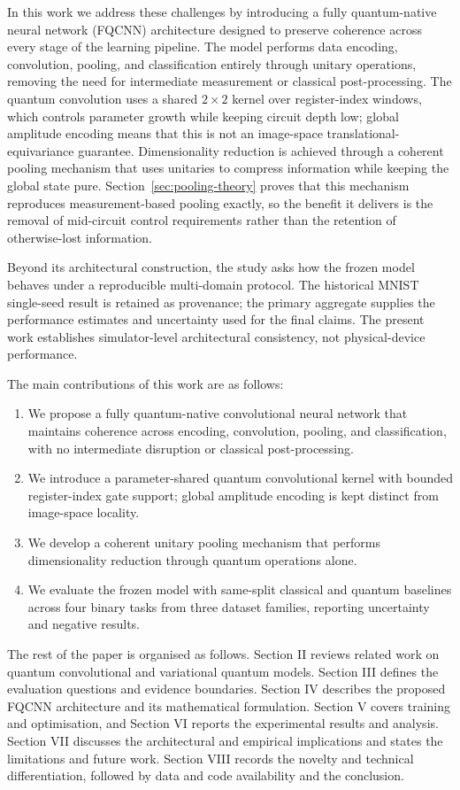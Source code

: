 \documentclass[conference]{IEEEtran}
\begin{document}
In this work we address these challenges by introducing a fully quantum-native neural network (FQCNN) architecture designed to preserve coherence across every stage of the learning pipeline. The model performs data encoding, convolution, pooling, and classification entirely through unitary operations, removing the need for intermediate measurement or classical post-processing. The quantum convolution uses a shared $2\times2$ kernel over register-index windows, which controls parameter growth while keeping circuit depth low; global amplitude encoding means that this is not an image-space translational-equivariance guarantee. Dimensionality reduction is achieved through a coherent pooling mechanism that uses unitaries to compress information while keeping the global state pure. Section~\ref{sec:pooling-theory} proves that this mechanism reproduces measurement-based pooling exactly, so the benefit it delivers is the removal of mid-circuit control requirements rather than the retention of otherwise-lost information.

Beyond its architectural construction, the study asks how the frozen model behaves under a reproducible multi-domain protocol. The historical MNIST single-seed result is retained as provenance; the primary aggregate supplies the performance estimates and uncertainty used for the final claims. The present work establishes simulator-level architectural consistency, not physical-device performance.

The main contributions of this work are as follows:
\begin{enumerate}
\item We propose a fully quantum-native convolutional neural network that maintains coherence across encoding, convolution, pooling, and classification, with no intermediate disruption or classical post-processing.
\item We introduce a parameter-shared quantum convolutional kernel with bounded register-index gate support; global amplitude encoding is kept distinct from image-space locality.
\item We develop a coherent unitary pooling mechanism that performs dimensionality reduction through quantum operations alone.
\item We evaluate the frozen model with same-split classical and quantum baselines across four binary tasks from three dataset families, reporting uncertainty and negative results.
\end{enumerate}

The rest of the paper is organised as follows. Section II reviews related work
on quantum convolutional and variational quantum models. Section III defines
the evaluation questions and evidence boundaries. Section IV describes the
proposed FQCNN architecture and its mathematical formulation. Section V covers
training and optimisation, and Section VI reports the experimental results and
analysis. Section VII discusses the architectural and empirical implications
and states the limitations and future work. Section VIII records the novelty
and technical differentiation, followed by data and code availability and the
conclusion.
\end{document}
